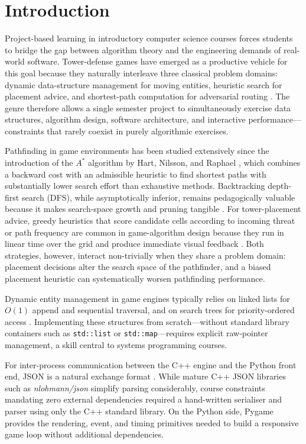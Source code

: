 \documentclass[conference]{IEEEtran}
\begin{document}
\section{Introduction}
\label{sec:intro}

Project-based learning in introductory computer science courses forces students
to bridge the gap between algorithm theory and the engineering demands of
real-world software.
Tower-defense games have emerged as a productive vehicle for this goal because
they naturally interleave three classical problem domains: dynamic data-structure
management for moving entities, heuristic search for placement advice, and
shortest-path computation for adversarial routing \cite{cormen2022algorithms}.
The genre therefore allows a single semester project to simultaneously exercise
data structures, algorithm design, software architecture, and interactive
performance—constraints that rarely coexist in purely algorithmic exercises.

Pathfinding in game environments has been studied extensively since the
introduction of the $A^*$ algorithm by Hart, Nilsson, and Raphael
\cite{hart1968astar}, which combines a backward cost with an admissible
heuristic to find shortest paths with substantially lower search effort than
exhaustive methods.
Backtracking depth-first search (DFS), while asymptotically inferior, remains
pedagogically valuable because it makes search-space growth and pruning tangible
\cite{cormen2022algorithms}.
For tower-placement advice, greedy heuristics that score candidate cells
according to incoming threat or path frequency are common in game-algorithm design because
they run in linear time over the grid and produce immediate visual feedback
\cite{cormen2022algorithms}.
Both strategies, however, interact non-trivially when they share a problem
domain: placement decisions alter the search space of the pathfinder, and a
biased placement heuristic can systematically worsen pathfinding performance.

Dynamic entity management in game engines typically relies on linked lists for
$O(1)$ append and sequential traversal, and on search trees for priority-ordered
access \cite{cormen2022algorithms}.
Implementing these structures from scratch—without standard library containers
such as \texttt{std::list} or \texttt{std::map}—requires explicit raw-pointer
management, a skill central to systems programming courses.

For inter-process communication between the C++ engine and the Python front end,
JSON is a natural exchange format \cite{python3json}.
While mature C++ JSON libraries such as \emph{nlohmann/json} \cite{nlohmann2024json}
simplify parsing considerably, course constraints mandating zero external
dependencies required a hand-written serialiser and parser using only the C++
standard library.
On the Python side, Pygame \cite{pygame2024docs} provides the rendering,
event, and timing primitives needed to build a responsive game loop without
additional dependencies.
\end{document}
